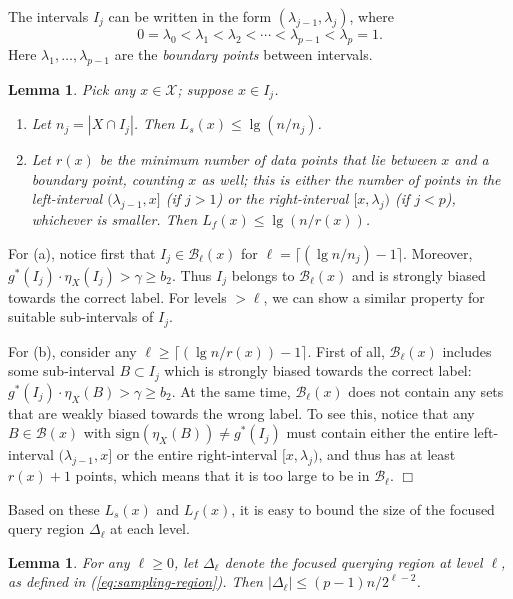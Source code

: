 \documentclass{article}
\def\X{{\mathcal X}}
\def\B{{\mathcal B}}
\newtheorem{lemma}[thm]{Lemma}
\newenvironment{proof}{\noindent {\sc Proof:}}{$\Box$ \medskip}
\begin{document}
The intervals $I_j$ can be written in the form $(\lambda_{j-1}, \lambda_j)$, where
$$ 0 = \lambda_0 < \lambda_1 < \lambda_2 < \cdots < \lambda_{p-1} < \lambda_p = 1 .$$
Here $\lambda_1, \ldots, \lambda_{p-1}$ are the \emph{boundary points} between intervals.
\begin{lemma}
Pick any $x \in \X$; suppose $x \in I_j$.
\begin{enumerate}
\item[(a)] Let $n_j = |X \cap I_j|$. Then $L_s(x) \leq \lg (n/n_j)$.
\item[(b)] Let $r(x)$ be the minimum number of data points that lie between $x$ and a boundary point, counting $x$ as well; this is either the number of points in the left-interval $(\lambda_{j-1},x]$ (if $j > 1$) or the right-interval $[x, \lambda_j)$ (if $j < p$), whichever is smaller. Then $L_f(x) \leq \lg (n/r(x))$.
\end{enumerate}
\label{lemma:oned-massart-Lsf}
\end{lemma}
\begin{proof}
For (a), notice first that $I_j \in \B_{\ell}(x)$ for $\ell = \lceil (\lg n/n_j) - 1 \rceil$. Moreover, $g^*(I_j) \cdot \eta_X(I_j) > \gamma \geq b_2$. Thus $I_j$ belongs to $\B_\ell(x)$ and is strongly biased towards the correct label. For levels $> \ell$, we can show a similar property for suitable sub-intervals of $I_j$.

For (b), consider any $\ell \geq \lceil (\lg n/r(x)) - 1 \rceil$. First of all, $\B_\ell(x)$ includes some sub-interval $B \subset I_j$ which is strongly biased towards the correct label: $g^*(I_j) \cdot \eta_X(B) > \gamma \geq b_2$. At the same time, $\B_\ell(x)$ does not contain any sets that are weakly biased towards the wrong label. To see this, notice that any $B \in \B(x)$ with $\mbox{sign}(\eta_X(B)) \neq g^*(I_j)$ must contain either the entire left-interval $(\lambda_{j-1},x]$ or the entire right-interval $[x, \lambda_j)$, and thus has at least $r(x) + 1$ points, which means that it is too large to be in $\B_\ell$.
\end{proof}

Based on these $L_s(x)$ and $L_f(x)$, it is easy to bound the size of the focused query region $\Delta_\ell$ at each level.
\begin{lemma}
For any $\ell \geq 0$, let $\Delta_\ell$ denote the focused querying region at level $\ell$, as defined in (\ref{eq:sampling-region}). Then $|\Delta_\ell| \leq (p-1)n/2^{\ell-2}$.
\label{lemma:oned-massart-query-region}
\end{lemma}
\end{document}
